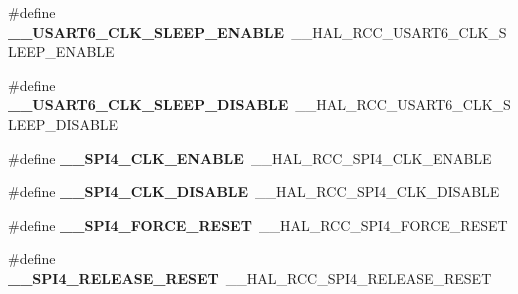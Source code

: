 \begin{DoxyCompactItemize}
\item 
\hypertarget{group___h_a_l___r_c_c___aliased_gaabd2ca8c095af0b15f7da6145c4bf5ee}{\#define {\bfseries \-\_\-\-\_\-\-U\-S\-A\-R\-T6\-\_\-\-C\-L\-K\-\_\-\-S\-L\-E\-E\-P\-\_\-\-E\-N\-A\-B\-L\-E}~\-\_\-\-\_\-\-H\-A\-L\-\_\-\-R\-C\-C\-\_\-\-U\-S\-A\-R\-T6\-\_\-\-C\-L\-K\-\_\-\-S\-L\-E\-E\-P\-\_\-\-E\-N\-A\-B\-L\-E}\label{group___h_a_l___r_c_c___aliased_gaabd2ca8c095af0b15f7da6145c4bf5ee}

\item 
\hypertarget{group___h_a_l___r_c_c___aliased_gafaf27c45d3b3da58e5144c54a6765166}{\#define {\bfseries \-\_\-\-\_\-\-U\-S\-A\-R\-T6\-\_\-\-C\-L\-K\-\_\-\-S\-L\-E\-E\-P\-\_\-\-D\-I\-S\-A\-B\-L\-E}~\-\_\-\-\_\-\-H\-A\-L\-\_\-\-R\-C\-C\-\_\-\-U\-S\-A\-R\-T6\-\_\-\-C\-L\-K\-\_\-\-S\-L\-E\-E\-P\-\_\-\-D\-I\-S\-A\-B\-L\-E}\label{group___h_a_l___r_c_c___aliased_gafaf27c45d3b3da58e5144c54a6765166}

\item 
\hypertarget{group___h_a_l___r_c_c___aliased_ga910bbf1355bfeb7eaa6ee38c71073f74}{\#define {\bfseries \-\_\-\-\_\-\-S\-P\-I4\-\_\-\-C\-L\-K\-\_\-\-E\-N\-A\-B\-L\-E}~\-\_\-\-\_\-\-H\-A\-L\-\_\-\-R\-C\-C\-\_\-\-S\-P\-I4\-\_\-\-C\-L\-K\-\_\-\-E\-N\-A\-B\-L\-E}\label{group___h_a_l___r_c_c___aliased_ga910bbf1355bfeb7eaa6ee38c71073f74}

\item 
\hypertarget{group___h_a_l___r_c_c___aliased_ga8903b53e01525864794aed36ce5283b2}{\#define {\bfseries \-\_\-\-\_\-\-S\-P\-I4\-\_\-\-C\-L\-K\-\_\-\-D\-I\-S\-A\-B\-L\-E}~\-\_\-\-\_\-\-H\-A\-L\-\_\-\-R\-C\-C\-\_\-\-S\-P\-I4\-\_\-\-C\-L\-K\-\_\-\-D\-I\-S\-A\-B\-L\-E}\label{group___h_a_l___r_c_c___aliased_ga8903b53e01525864794aed36ce5283b2}

\item 
\hypertarget{group___h_a_l___r_c_c___aliased_gab55fe3173b3e14b97dd5c87cd99162b2}{\#define {\bfseries \-\_\-\-\_\-\-S\-P\-I4\-\_\-\-F\-O\-R\-C\-E\-\_\-\-R\-E\-S\-E\-T}~\-\_\-\-\_\-\-H\-A\-L\-\_\-\-R\-C\-C\-\_\-\-S\-P\-I4\-\_\-\-F\-O\-R\-C\-E\-\_\-\-R\-E\-S\-E\-T}\label{group___h_a_l___r_c_c___aliased_gab55fe3173b3e14b97dd5c87cd99162b2}

\item 
\hypertarget{group___h_a_l___r_c_c___aliased_ga13c41edae57cfce264235a5568811bd5}{\#define {\bfseries \-\_\-\-\_\-\-S\-P\-I4\-\_\-\-R\-E\-L\-E\-A\-S\-E\-\_\-\-R\-E\-S\-E\-T}~\-\_\-\-\_\-\-H\-A\-L\-\_\-\-R\-C\-C\-\_\-\-S\-P\-I4\-\_\-\-R\-E\-L\-E\-A\-S\-E\-\_\-\-R\-E\-S\-E\-T}\label{group___h_a_l___r_c_c___aliased_ga13c41edae57cfce264235a5568811bd5}


\end{DoxyCompactItemize}

